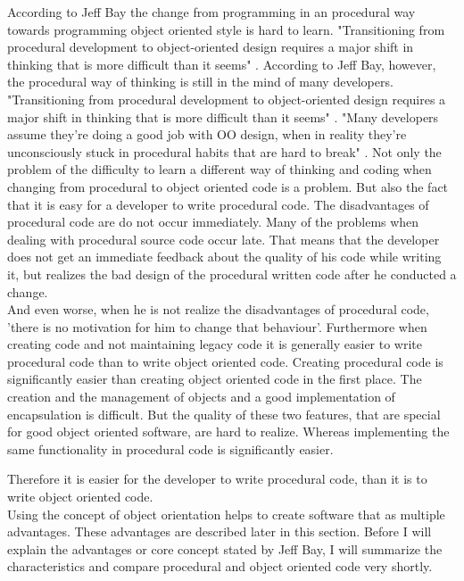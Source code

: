 According to Jeff Bay the change from programming in an procedural way towards programming object oriented style is hard to learn. "Transitioning from procedural development to object-oriented design requires a major shift in thinking that is more difficult than it seems" \cite[p. 70]{bay2008}. 
According to Jeff Bay, however, the procedural way of thinking is still in the mind of many developers. "Transitioning from procedural development to object-oriented design requires a major shift in thinking that is more difficult than it seems" \cite[p. 70]{bay2008}. %
"Many developers assume they’re doing a good job with OO design, when in reality they’re unconsciously
stuck in procedural habits that are hard to break" \cite[p.70]{bay2008}.
Not only the problem of the difficulty to learn a different way of thinking and coding when changing from procedural to object oriented code is a problem. But also the fact that it is easy for a developer to write procedural code. The disadvantages of procedural code are do not occur immediately. Many of the problems when dealing with procedural source code occur late. That means that the developer does not get an immediate feedback about the quality of his code while writing it, but realizes the bad design of the procedural written code after he conducted a change. \\
And even worse, when he is not realize the disadvantages of procedural code, 'there is no motivation for him to change that behaviour'. Furthermore when creating code and not maintaining legacy code it is generally easier to write procedural code than to write object oriented code. Creating procedural code is significantly easier than creating object oriented code in the first place. The creation and the management of objects and a good implementation of encapsulation is difficult. But the quality of these two features, that are special for good object oriented software, are hard to realize. Whereas implementing the same functionality in procedural code is significantly easier.

Therefore it is easier for the developer to write procedural code, than it is to write object oriented code. \\

Using the concept of object orientation helps to create software that as multiple advantages. These advantages are described later in this section. Before I will explain the advantages or core concept stated by Jeff Bay, I will summarize the characteristics and compare procedural and object oriented code very shortly. \\

